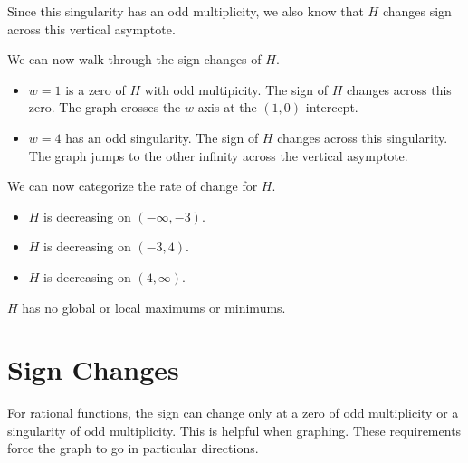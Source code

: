 \documentclass{ximera}
\begin{document}
\begin{example}
Since this singularity has an odd multiplicity, we also know that $H$ changes sign across this vertical asymptote.


We can now walk through the sign changes of $H$.

\begin{itemize}
\item $w = 1$ is a zero of $H$ with odd multipicity.  The sign of $H$ changes across this zero. The graph crosses the $w$-axis at the $(1, 0)$ intercept.
\item $w = 4$ has an odd singularity. The sign of $H$ changes across this singularity.  The graph jumps to the other infinity across the vertical asymptote.
\end{itemize}



We can now categorize the rate of change for $H$.

\begin{itemize}
\item $H$ is decreasing on $(-\infty, -3)$.
\item $H$ is decreasing on $(-3, 4)$.
\item $H$ is decreasing on $(4,\infty)$.
\end{itemize}

$H$ has no global or local maximums or minimums.


\end{example}







\section{Sign Changes}

For rational functions, the sign can change only at a zero of odd multiplicity or a singularity of odd multiplicity. This is helpful when graphing. These requirements force the graph to go in particular directions.
\end{document}
